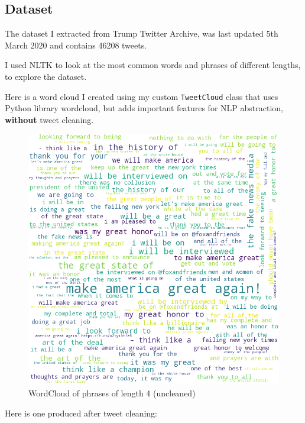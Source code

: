 \documentclass{article}
\begin{document}
\subsection{Dataset}

The dataset I extracted from Trump Twitter Archive, was last updated 5th March 2020 and contains 46208 tweets.

I used NLTK to look at the most common words and phrases of different lengths, to explore the dataset.

Here is a word cloud I created using my custom \lstinline{TweetCloud} class that uses Python library wordcloud, but adds important features for NLP abstraction, \textbf{without} tweet cleaning.

\begin{figure}[H]
	\includegraphics[width=\linewidth]{images/wordcloud4.png}
	\caption{WordCloud of phrases of length 4 (uncleaned)}
	\label{fig:wd1}
\end{figure}

Here is one produced after tweet cleaning:

\begin{figure}[H]
\end{figure}
\end{document}
